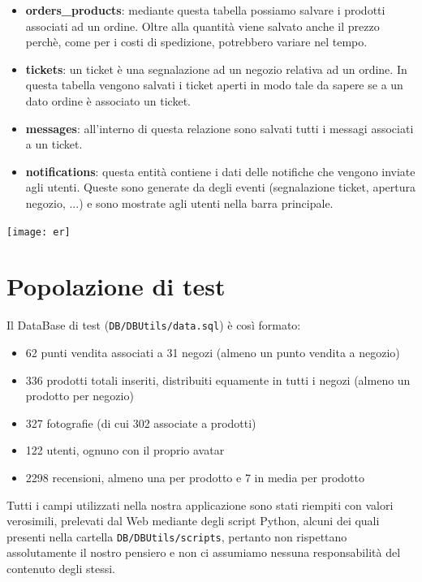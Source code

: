 \begin{itemize}
  \item \textbf{orders\_products}: mediante questa tabella possiamo salvare i prodotti associati ad un ordine. Oltre alla quantità viene salvato anche il prezzo perchè, come per i costi di spedizione, potrebbero variare nel tempo.
  \item \textbf{tickets}: un ticket è una segnalazione ad un negozio relativa ad un ordine. In questa tabella vengono salvati i ticket aperti in modo tale da sapere se a un dato ordine è associato un ticket.
  \item \textbf{messages}: all'interno di questa relazione sono salvati tutti i messagi associati a un ticket.
  \item \textbf{notifications}: questa entità contiene i dati delle notifiche che vengono inviate agli utenti. Queste sono generate da degli eventi (segnalazione ticket, apertura negozio, ...) e sono mostrate agli utenti nella barra principale.
\end{itemize}

\begin{center}
\texttt{[image: er]}
\end{center}


\section{Popolazione di test}
Il DataBase di test (\texttt{DB/DBUtils/data.sql}) è così formato:
\begin{itemize}

  \item 62 punti vendita associati a 31 negozi (almeno un punto vendita a negozio)
  \item 336 prodotti totali inseriti, distribuiti equamente in tutti i negozi (almeno un prodotto per negozio)
  \item 327 fotografie (di cui 302 associate a prodotti)
  \item 122 utenti, ognuno con il proprio avatar
  \item 2298 recensioni, almeno una per prodotto e 7 in media per prodotto

\end{itemize}

Tutti i campi utilizzati nella nostra applicazione sono stati riempiti con valori verosimili, prelevati dal Web mediante degli script Python, alcuni dei quali presenti nella cartella \texttt{DB/DBUtils/scripts}, pertanto non rispettano assolutamente il nostro pensiero e non ci assumiamo nessuna responsabilità del contenuto degli stessi.

